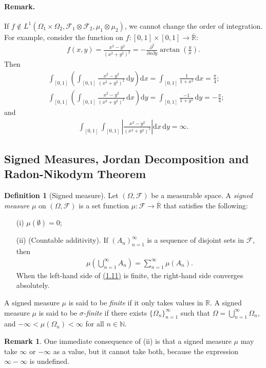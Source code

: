 \documentclass{article}
\numberwithin{equation}{section}
\renewcommand{\d}{\mathrm{d}}
\theoremstyle{plain}
\theoremstyle{definition}
\newtheorem{definition}[theorem]{Definition}
\newtheorem*{remark}{Remark}
\begin{document}
\paragraph{Remark.} If $f\notin L^1(\Omega_1\times\Omega_2,\mathscr{F}_1\otimes\mathscr{F}_2,\mu_1\otimes\mu_2)$, we cannot change the order of integration. For example, consider the function on $f:[0,1]\times[0,1]\to\overline{\mathbb{R}}$:
\begin{align*}
	f(x,y)=\frac{x^2-y^2}{(x^2+y^2)^2} = -\frac{\partial^2}{\partial x\partial y}\arctan\left(\frac{y}{x}\right).
\end{align*}
Then
\begin{align*}
	&\int_{[0,1]}\left(\int_{[0,1]} \frac{x^2-y^2}{(x^2+y^2)^2}\,\d y\right)\d x = \int_{[0,1]}\frac{1}{1+x^2}\,\d x = \frac{\pi}{4};\\
	&\int_{[0,1]}\left(\int_{[0,1]} \frac{x^2-y^2}{(x^2+y^2)^2}\,\d x\right)\d y = \int_{[0,1]}\frac{-1}{1+y^2}\,\d y = -\frac{\pi}{4};
\end{align*}
and
\begin{align*}
	\int_{[0,1]}\int_{[0,1]}\left\vert\frac{x^2-y^2}{(x^2+y^2)^2}\right\vert \d x\,\d y=\infty.
\end{align*}

\newpage
\subsection{Signed Measures, Jordan Decomposition and Radon-Nikodym Theorem}
\begin{definition}[Signed measure]\label{def:1.53} Let $(\Omega,\mathscr{F})$ be a measurable space. A \textit{signed measure} $\mu$ on $(\Omega,\mathscr{F})$ is a set function $\mu:\mathscr{F}\to\overline{\mathbb{R}}$ that satisfies the following:
\begin{itemize}
	\item[(i)] $\mu(\emptyset)=0$;
	\item[(ii)] (Countable additivity). If $(A_n)_{n=1}^\infty$ is a sequence of disjoint sets in $\mathscr{F}$, then
	\begin{align*}
		\mu\left(\bigcup_{n=1}^\infty A_n\right) = \sum_{n=1}^\infty \mu(A_n).\tag{1.11}\label{eq:1.11}
	\end{align*}
    When the left-hand side of \hyperref[eq:1.11]{(1.11)} is finite, the right-hand side converges absolutely.
\end{itemize}
A signed measure $\mu$ is said to be \textit{finite} if it only takes values in $\mathbb{R}$. A signed measure $\mu$ is said to be \textit{$\sigma$-finite} if there exists $\{\Omega_n\}_{n=1}^\infty$ such that $\Omega=\bigcup_{n=1}^\infty\Omega_n$, and $-\infty<\mu(\Omega_n)<\infty$ for all $n\in\mathbb{N}$.
\end{definition}
\begin{remark} One immediate consequence of (ii) is that a signed measure $\mu$ may take $\infty$ or $-\infty$ as a value, but it cannot take both, because the expression $\infty - \infty$ is undefined.
\end{remark}
\end{document}

